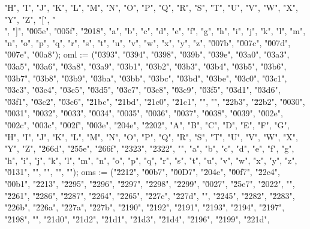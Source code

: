 {             "H",      "I",      "J",      "K",      "L",      "M",      "N",      "O",
             "P",      "Q",      "R",      "S",      "T",      "U",      "V",      "W",
             "X",      "Y",      "Z",      "[",      "\\",     "]",      "\u005e", "\u005f",
             "\u2018", "a",      "b",      "c",      "d",      "e",      "f",      "g",
             "h",      "i",      "j",      "k",      "l",      "m",      "n",      "o",
             "p",      "q",      "r",      "s",      "t",      "u",      "v",      "w",
             "x",      "y",      "z",      "\u007b", "\u007c", "\u007d", "\u007e", "\u00a8");
    oml  := ("\u0393", "\u0394", "\u0398", "\u039b", "\u039e", "\u03a0", "\u03a3", "\u03a5",
             "\u03a6", "\u03a8", "\u03a9", "\u03b1", "\u03b2", "\u03b3", "\u03b4", "\u03b5",
             "\u03b6", "\u03b7", "\u03b8", "\u03b9", "\u03ba", "\u03bb", "\u03bc", "\u03bd",
             "\u03be", "\u03c0", "\u03c1", "\u03c3", "\u03c4", "\u03c5", "\u03d5", "\u03c7",
             "\u03c8", "\u03c9", "\u03f5", "\u03d1", "\u03d6", "\u03f1", "\u03c2", "\u03c6",
             "\u21bc", "\u21bd", "\u21c0", "\u21c1", "",       "",       "\u22b3", "\u22b2",
             "\u0030", "\u0031", "\u0032", "\u0033", "\u0034", "\u0035", "\u0036", "\u0037",
             "\u0038", "\u0039", "\u002e", "\u002c", "\u003c", "\u002f", "\u003e", "\u204e",
             "\u2202", "A",      "B",      "C",      "D",      "E",      "F",      "G",
             "H",      "I",      "J",      "K",      "L",      "M",      "N",      "O",
             "P",      "Q",      "R",      "S",      "T",      "U",      "V",      "W",
             "X",      "Y",      "Z",      "\u266d", "\u255e", "\u266f", "\u2323", "\u2322",
             "",       "a",      "b",      "c",      "d",      "e",      "f",      "g",
             "h",      "i",      "j",      "k",      "l",      "m",      "n",      "o",
             "p",      "q",      "r",      "s",      "t",      "u",      "v",      "w",
             "x",      "y",      "z",      "\u0131", "",       "",       "",       "");
    oms  := ("\u2212", "\u00b7", "\u00D7", "\u204e", "\u00f7", "\u22c4", "\u00b1", "\u2213",
             "\u2295", "\u2296", "\u2297", "\u2298", "\u2299", "\u0027", "\u25e7", "\u2022",
             "",       "\u2261", "\u2286", "\u2287", "\u2264", "\u2265", "\u227c", "\u227d",
             "",       "\u2245", "\u2282", "\u2283", "\u226b", "\u226a", "\u227a", "\u227b",
             "\u2190", "\u2192", "\u2191", "\u2193", "\u2194", "\u2197", "\u2198", "",
             "\u21d0", "\u21d2", "\u21d1", "\u21d3", "\u21d4", "\u2196", "\u2199", "\u221d",
}
